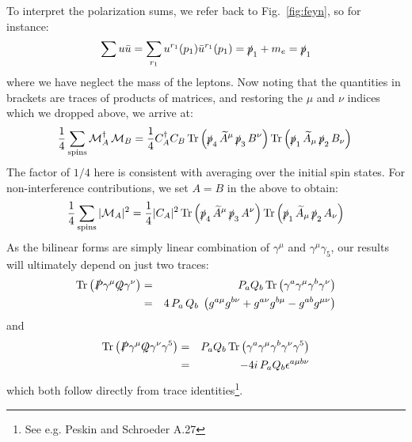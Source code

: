 \documentclass[12pt]{article}
\DeclareMathOperator{\Tr}{Tr}
\newcommand{\Ps} {\ensuremath{\slashed{P}}}
\newcommand{\Qs} {\ensuremath{\slashed{Q}}}
\newcommand{\ps}{\ensuremath{\slashed{p}}}
\begin{document}
To interpret the polarization sums, we refer back to Fig.~\ref{fig:feyn}, so for instance:
\begin{equation*}
\sum u \bar{u} = \sum_{r_1} u^{r_1}(p_1) \bar{u}^{r_1}(p_1) = \ps_1 + m_e = \ps_1
\end{equation*}
where we have neglect the mass of the leptons.  Now noting that the quantities in brackets are traces of products of matrices, and restoring the $\mu$ and $\nu$ indices which we dropped above, we arrive at: 
\begin{equation}
\frac{1}{4}\sum_{\rm spins}  \mathcal{M}_A^{\dagger} \, \mathcal{M}_B = 
\frac{1}{4} C_A^\dagger C_B \Tr\left( \slashed{p}_4 \, \widetilde{A}^\mu \, \slashed{p}_3\, B^\nu \right) \Tr\left( \slashed{p}_1 \, \widetilde{A}_{\mu} \, \slashed{p}_2 \, B_{\nu} \right) \label{eqn:mab} \\
\end{equation}
The factor of $1/4$ here is consistent with averaging over the initial spin states.   For non-interference contributions, we set $A=B$ in the above to obtain:
\begin{equation}
\frac{1}{4}\sum_{\rm spins}  |\mathcal{M}_A|^2 = 
\frac{1}{4} |C_A|^2 \Tr\left( \slashed{p}_4 \, \widetilde{A}^\mu \, \slashed{p}_3\, A^\nu \right) \Tr\left( \slashed{p}_1 \, \widetilde{A}_\mu \, \slashed{p}_2 \, A_\nu \right) \label{eqn:maa}
\end{equation}
As the bilinear forms are simply linear combination of $\gamma^\mu$ and $\gamma^\mu \gamma_5$, our results will ultimately depend on just two traces:
\begin{eqnarray}
\Tr\left(\Ps\gamma^\mu\Qs\gamma^\nu\right) &=& P_a Q_b \Tr\left(\gamma^a\gamma^\mu\gamma^b\gamma^\nu\right) \nonumber \\
&=& 4 \, P_a \, Q_b \; \left(g^{a\mu}g^{b\nu}+g^{a\nu}g^{b\mu}-g^{ab}g^{\mu\nu}\right) \label{eqn:tra}
\end{eqnarray}
and
\begin{eqnarray}
\Tr\left(\Ps\gamma^\mu\Qs\gamma^\nu\gamma^5\right) &=& P_a Q_b \Tr\left(\gamma^a\gamma^\mu\gamma^b\gamma^\nu\gamma^5\right) \nonumber \\
&=& -4i \, P_a Q_b \epsilon^{a\mu b \nu} \label{eqn:trb}
\end{eqnarray}
which both follow directly from trace identities\footnote{See e.g. Peskin and Schroeder A.27}.
\end{document}
